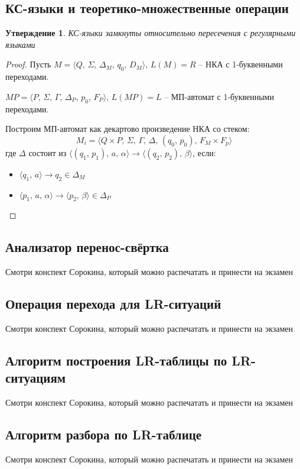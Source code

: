 \documentclass[a4paper,12pt]{article}
\theoremstyle{plain}
\newtheorem{proposition}{Утверждение}[subsection]
\theoremstyle{definition}
\theoremstyle{remark}
\begin{document}
\subsection{КС-языки и теоретико-множественные операции}
\begin{proposition}
	КС-языки замкнуты относительно пересечения с регулярными языками
\end{proposition}

\begin{proof}
	Пусть $M = \langle Q,\, \Sigma,\, \Delta_M,\, q_0,\, D_M\rangle,\, L(M) = R$ -- НКА с 1-буквенными переходами.

	$MP = \langle P,\, \Sigma,\, \Gamma,\, \Delta_P,\, p_0,\, F_P\rangle,\, L(MP) = L$ -- МП-автомат с 1-буквенными переходами.

	Построим МП-автомат как декартово произведение НКА со стеком:
	\[
		M_i = \langle Q \times P,\, \Sigma,\, \Gamma,\, \Delta,\, (q_0,\, p_0),\, F_M \times F_p\rangle
	\]
	где $\Delta$ состоит из $\langle(q_1,\, p_1),\, a,\,\alpha\rangle \to\langle (q_2,\, p_2),\, \beta\rangle$, если:
	\begin{itemize}
		\item $\langle q_1,\, a\rangle \to q_2 \in \Delta_M$
		\item $\langle p_1,\,a,\,\alpha\rangle\to\langle p_2,\, \beta\rangle \in \Delta_P$
	\end{itemize}
\end{proof}

\subsection{Анализатор перенос-свёртка}
Смотри конспект Сорокина, который можно распечатать и принести на экзамен

\subsection{Операция перехода для LR-ситуаций}
Смотри конспект Сорокина, который можно распечатать и принести на экзамен

\subsection{Алгоритм построения LR-таблицы по LR-ситуациям}
Смотри конспект Сорокина, который можно распечатать и принести на экзамен

\subsection{Алгоритм разбора по LR-таблице}
Смотри конспект Сорокина, который можно распечатать и принести на экзамен
\end{document}
